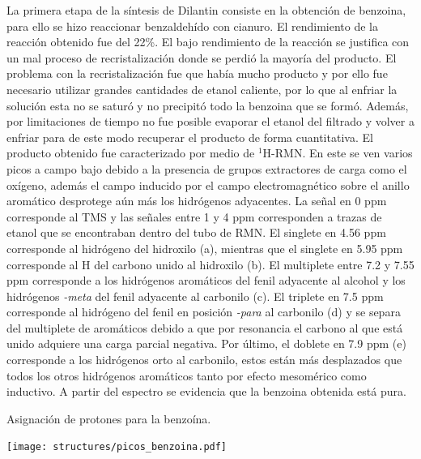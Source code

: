 \documentclass[fleqn,10pt]{SelfArx}
\begin{document}
La primera etapa de la síntesis de Dilantin consiste en la obtención de benzoina, para ello se hizo reaccionar benzaldehído con cianuro. El rendimiento de la reacción obtenido fue del 22\%. El bajo rendimiento de la reacción se justifica con un mal proceso de recristalización donde se perdió la mayoría del producto. El problema con la recristalización fue que había mucho producto y por ello fue necesario utilizar grandes cantidades de etanol caliente, por lo que al enfriar la solución esta no se saturó y no precipitó todo la benzoina que se formó. Además, por limitaciones de tiempo no fue posible evaporar el etanol del filtrado y volver a enfriar para de este modo recuperar el producto de forma cuantitativa. El producto obtenido fue caracterizado por medio de $^1$H-RMN. En este se ven varios picos a campo bajo debido a la presencia de grupos extractores de carga como el oxígeno, además el campo inducido por el campo electromagnético sobre el anillo aromático desprotege aún más los hidrógenos adyacentes. La señal en 0 ppm corresponde al TMS y las señales entre 1 y 4 ppm corresponden a trazas de etanol que se encontraban dentro del tubo de RMN. El singlete en 4.56 ppm corresponde al hidrógeno del hidroxilo (a), mientras que el singlete en 5.95 ppm corresponde al H del carbono unido al hidroxilo (b). El multiplete entre 7.2 y 7.55 ppm corresponde a los hidrógenos aromáticos del fenil adyacente al alcohol y los hidrógenos \textit{-meta} del fenil adyacente al carbonilo (c). El triplete en 7.5 ppm corresponde al hidrógeno del fenil en posición \textit{-para} al carbonilo (d) y se separa del multiplete de aromáticos debido a que por resonancia el carbono al que está unido adquiere una carga parcial negativa. Por último, el doblete en 7.9 ppm (e) corresponde a los hidrógenos orto al carbonilo, estos están más desplazados que todos los otros hidrógenos aromáticos tanto por efecto mesomérico como inductivo. A partir del espectro se evidencia que la benzoina obtenida está pura.
\begin{scheme}[h]
	\centering
	\caption{Asignaci\'on de protones para la benzo\'ina.}
	\texttt{[image: structures/picos\_benzoina.pdf]}
\end{scheme}
\end{document}
